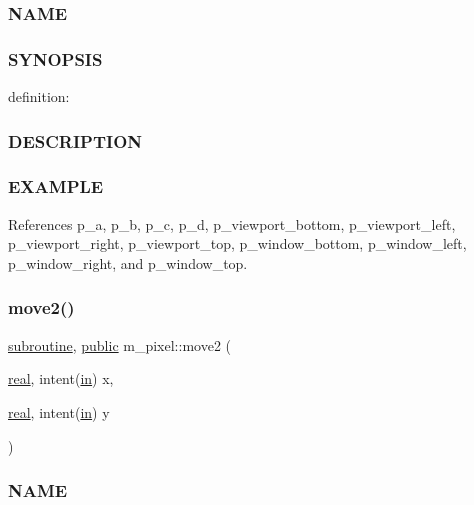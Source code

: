 \subsubsection*{N\+A\+ME}

\subsubsection*{S\+Y\+N\+O\+P\+S\+IS}

definition\+:

\subsubsection*{D\+E\+S\+C\+R\+I\+P\+T\+I\+ON}

\subsubsection*{E\+X\+A\+M\+P\+LE}

References p\+\_\+a, p\+\_\+b, p\+\_\+c, p\+\_\+d, p\+\_\+viewport\+\_\+bottom, p\+\_\+viewport\+\_\+left, p\+\_\+viewport\+\_\+right, p\+\_\+viewport\+\_\+top, p\+\_\+window\+\_\+bottom, p\+\_\+window\+\_\+left, p\+\_\+window\+\_\+right, and p\+\_\+window\+\_\+top.

\mbox{\label{namespacem__pixel_ab5d4dc474ff84dc0f3f35f4a395979e0}} 
\subsubsection{\texorpdfstring{move2()}{move2()}}
{\footnotesize\ttfamily \hyperlink{M__stopwatch_83_8txt_acfbcff50169d691ff02d4a123ed70482}{subroutine}, \hyperlink{M__stopwatch_83_8txt_a2f74811300c361e53b430611a7d1769f}{public} m\+\_\+pixel\+::move2 (\begin{DoxyParamCaption}\item[{\hyperlink{read__watch_83_8txt_abdb62bde002f38ef75f810d3a905a823}{real}, intent(\hyperlink{M__journal_83_8txt_afce72651d1eed785a2132bee863b2f38}{in})}]{x,  }\item[{\hyperlink{read__watch_83_8txt_abdb62bde002f38ef75f810d3a905a823}{real}, intent(\hyperlink{M__journal_83_8txt_afce72651d1eed785a2132bee863b2f38}{in})}]{y }\end{DoxyParamCaption})}



\subsubsection*{N\+A\+ME}


